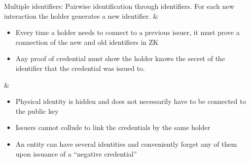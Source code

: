 \begin{table}[H]
\begin{funcprivtabular}{.26}{.28}{.39}
\begin{itemize}
		\end{itemize}
	\rowend
\hline
	Multiple identifiers: Pairwise identification through identifiers. For each new interaction the holder generates a new identifier. 
  & \begin{itemize}	
		\item Every time a holder needs to connect to a previous issuer, it must prove a connection of the new and old identifiers in ZK
    \item Any proof of credential must show the holder knows the secret of the identifier that the credential was issued to.
		\end{itemize}	 
	& \setlinenumbermargin{46.5em}\internallinenumbers
		\begin{itemize}	 
		\item Physical identity is hidden and does not necessarily have to be connected to the public key
    \item Issuers cannot collude to link the credentials by the same holder
    \item An entity can have several identities and conveniently forget any of them upon issuance of a “negative credential”
		\end{itemize}
	\rowend
\hline
\end{funcprivtabular}
\end{table}




